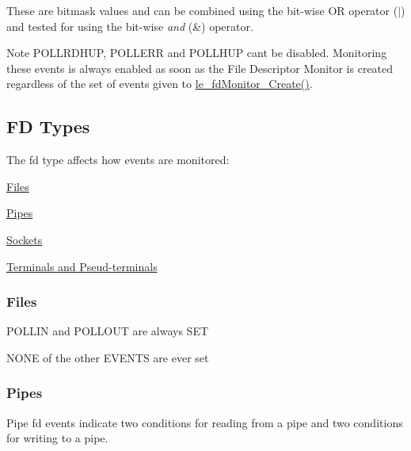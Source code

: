 These are bitmask values and can be combined using the bit-\/wise O\+R operator (\textquotesingle{}$\vert$\textquotesingle{}) and tested for using the bit-\/wise {\itshape and} (\textquotesingle{}\&\textquotesingle{}) operator.

\begin{DoxyNote}{Note}
{\ttfamily P\+O\+L\+L\+R\+D\+H\+U\+P}, {\ttfamily P\+O\+L\+L\+E\+R\+R} and {\ttfamily P\+O\+L\+L\+H\+U\+P} can\textquotesingle{}t be disabled. Monitoring these events is always enabled as soon as the File Descriptor Monitor is created regardless of the set of events given to \hyperlink{le__fd_monitor_8h_a52902d634d810f9b7a23c53c9c5164f0}{le\+\_\+fd\+Monitor\+\_\+\+Create()}.
\end{DoxyNote}
\hypertarget{c_fd_monitor_c_fdTypes}{}\subsection{F\+D Types}\label{c_fd_monitor_c_fdTypes}
The fd type affects how events are monitored\+:


\begin{DoxyItemize}
\item \hyperlink{c_fd_monitor_c_fdTypes_files}{Files}
\item \hyperlink{c_fd_monitor_c_fdTypes_pipes}{Pipes}
\item \hyperlink{c_fd_monitor_c_fdTypes_sockets}{Sockets}
\item \hyperlink{c_fd_monitor_c_fdTypes_terminals}{Terminals and Pseud-\/terminals}
\end{DoxyItemize}\hypertarget{c_fd_monitor_c_fdTypes_files}{}\subsubsection{Files}\label{c_fd_monitor_c_fdTypes_files}

\begin{DoxyItemize}
\item P\+O\+L\+L\+I\+N and P\+O\+L\+L\+O\+U\+T are always S\+E\+T
\item N\+O\+N\+E of the other E\+V\+E\+N\+T\+S are ever set
\end{DoxyItemize}\hypertarget{c_fd_monitor_c_fdTypes_pipes}{}\subsubsection{Pipes}\label{c_fd_monitor_c_fdTypes_pipes}
Pipe fd events indicate two conditions for reading from a pipe and two conditions for writing to a pipe.

